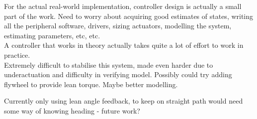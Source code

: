 For the actual real-world implementation, controller design is actually a small part of the work. Need to worry about acquiring good estimates of states, writing all the peripheral software, drivers, sizing actuators, modelling the system, estimating parameters, etc, etc. \\
A controller that works in theory actually takes quite a lot of effort to work in practice.  \\
Extremely difficult to stabilise this system, made even harder due to underactuation and difficulty in verifying model. Possibly could try adding flywheel to provide lean torque. Maybe better modelling.

Currently only using lean angle feedback, to keep on straight path would need some way of knowing heading - future work? \\